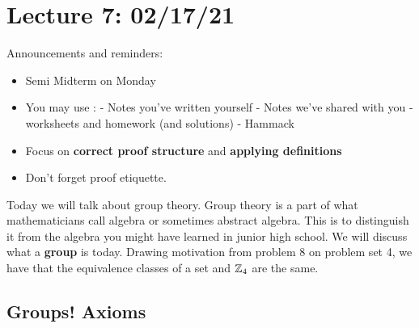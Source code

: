 \section{Lecture 7: 02/17/21}
Announcements and reminders:
\begin{itemize}
    \item Semi Midterm on Monday
    \item You may use :
    \subitem - Notes you've written yourself
    \subitem - Notes we've shared with you
    \subitem - worksheets and homework (and solutions)
    \subitem - Hammack
    \item Focus on \textbf{correct proof structure} and \textbf{applying definitions}
    \item Don't forget proof etiquette.
\end{itemize}
Today we will talk about group theory. Group theory is a part of what mathematicians call algebra or sometimes abstract algebra. This is to distinguish it from the algebra you might have learned in junior high school. We will discuss what a \textbf{group} is today. Drawing motivation from problem 8 on problem set 4, we have that the equivalence classes of a set and $\mathbb{Z}_4$ are the same. 

\subsection{Groups! Axioms}

